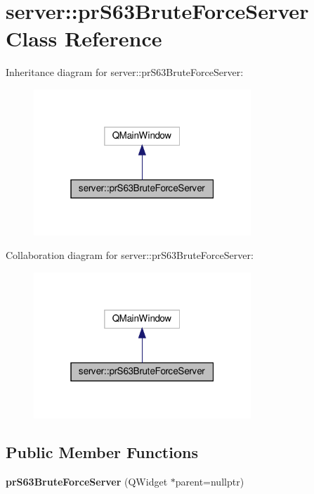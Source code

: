 \hypertarget{classserver_1_1pr_s63_brute_force_server}{}\section{server\+:\+:pr\+S63\+Brute\+Force\+Server Class Reference}
\label{classserver_1_1pr_s63_brute_force_server}


Inheritance diagram for server\+:\+:pr\+S63\+Brute\+Force\+Server\+:\nopagebreak
\begin{figure}[H]
\begin{center}
\leavevmode
\includegraphics[width=232pt]{classserver_1_1pr_s63_brute_force_server__inherit__graph}
\end{center}
\end{figure}


Collaboration diagram for server\+:\+:pr\+S63\+Brute\+Force\+Server\+:\nopagebreak
\begin{figure}[H]
\begin{center}
\leavevmode
\includegraphics[width=232pt]{classserver_1_1pr_s63_brute_force_server__coll__graph}
\end{center}
\end{figure}
\subsection*{Public Member Functions}
\begin{DoxyCompactItemize}
\item 
\mbox{\label{classserver_1_1pr_s63_brute_force_server_a50d074ec310fd67ed64de5bce5cff5ab}} 
{\bfseries pr\+S63\+Brute\+Force\+Server} (Q\+Widget $\ast$parent=nullptr)
\end{DoxyCompactItemize}


